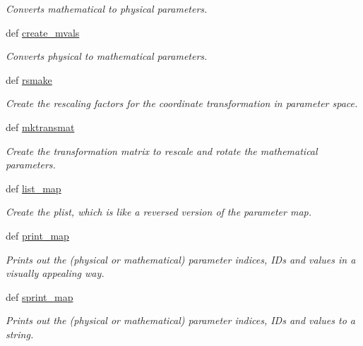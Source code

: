 \begin{DoxyCompactItemize}
\begin{DoxyCompactList}\small\item\em Converts mathematical to physical parameters. \end{DoxyCompactList}\item 
def \hyperlink{classforcebalance_1_1forcefield_1_1FF_ae5fba4d3e22f210632ead3653e6e12dd}{create\-\_\-mvals}
\begin{DoxyCompactList}\small\item\em Converts physical to mathematical parameters. \end{DoxyCompactList}\item 
def \hyperlink{classforcebalance_1_1forcefield_1_1FF_a88715f96ff8e14c3c83b4f976ad147b4}{rsmake}
\begin{DoxyCompactList}\small\item\em Create the rescaling factors for the coordinate transformation in parameter space. \end{DoxyCompactList}\item 
def \hyperlink{classforcebalance_1_1forcefield_1_1FF_acf0ce8fc4e9fbf5257f93d14d4a4f10f}{mktransmat}
\begin{DoxyCompactList}\small\item\em Create the transformation matrix to rescale and rotate the mathematical parameters. \end{DoxyCompactList}\item 
def \hyperlink{classforcebalance_1_1forcefield_1_1FF_ac0046446695a65cb2489fdb560ef5929}{list\-\_\-map}
\begin{DoxyCompactList}\small\item\em Create the plist, which is like a reversed version of the parameter map. \end{DoxyCompactList}\item 
def \hyperlink{classforcebalance_1_1forcefield_1_1FF_a61082e99cb3a02e35c80bbea919eaafa}{print\-\_\-map}
\begin{DoxyCompactList}\small\item\em Prints out the (physical or mathematical) parameter indices, I\-Ds and values in a visually appealing way. \end{DoxyCompactList}\item 
def \hyperlink{classforcebalance_1_1forcefield_1_1FF_a6d7a82431dc3e8625cd644f1b41defd6}{sprint\-\_\-map}
\begin{DoxyCompactList}\small\item\em Prints out the (physical or mathematical) parameter indices, I\-Ds and values to a string. \end{DoxyCompactList}\item 

\end{DoxyCompactItemize}
